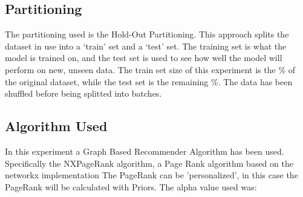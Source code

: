 \documentclass[12pt, a4paper]{article}
\begin{document}
\newpage
\subsection{Partitioning}

The partitioning used is the Hold-Out Partitioning.
This approach splits the dataset in use into a ‘train’ set and a ‘test’ set.
The training set is what the model is trained on, and the test set is used to see how
well the model will perform on new, unseen data.
\hfill\break
\hfill\break
The train set size of this experiment is the \%
of the original dataset, while the test set is the remaining \%.
\hfill\break
\hfill\break
{}
The data has been shuffled before being splitted into batches.




\subsection{Algorithm Used}
In this experiment a Graph Based Recommender Algorithm has been used.
Specifically the NXPageRank algorithm, a Page Rank algorithm based on the networkx implementation
The PageRank can be 'personalized', in this case the PageRank will be calculated with Priors.
The alpha value used was: 
\end{document}
